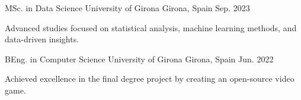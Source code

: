 

\begin{cventries}

  \cventry
    {MSc. in Data Science} %
    {University of Girona} %
    {Girona, Spain} %
    {Sep. 2023} %
    {
      \begin{cvitems} %
      \item {Advanced studies focused on statistical analysis, machine learning methods, and data-driven insights.}
      \end{cvitems}
    }

    \cventry
    {BEng. in Computer Science} %
    {University of Girona} %
    {Girona, Spain} %
    {Jun. 2022} %
    {
      \begin{cvitems} %
        \item {Achieved excellence in the final degree project by creating an open-source video game.}
      \end{cvitems}
    }

\end{cventries}
